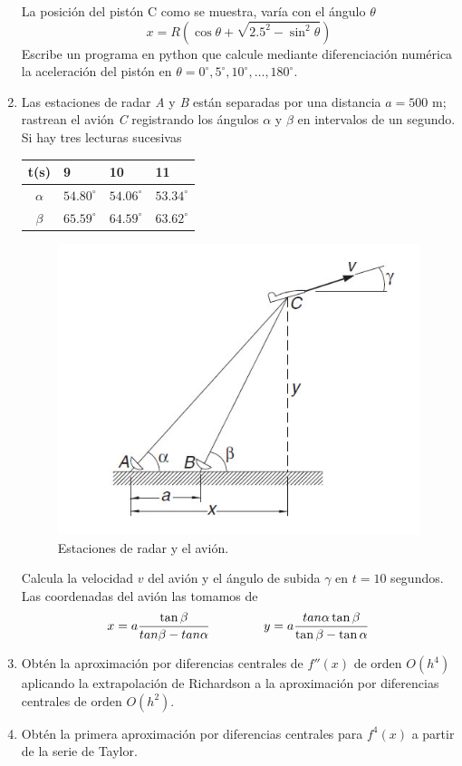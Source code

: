 \documentclass[11pt]{article}
\begin{document}
\begin{enumerate}
\begin{center}
\begin{tikzpicture}[font=\small, scale=1.4, fill=]
\end{tikzpicture}
\end{center}
La posición del pistón C como se muestra, varía con el ángulo $\theta$
\[x = R \left( \cos \theta + \sqrt{2.5^{2} - \sin^{2} \theta} \right)\]
Escribe un programa en python que calcule mediante diferenciación numérica la aceleración del pistón en $\theta= 0^{\circ}, 5^{\circ}, 10^{\circ},\ldots, 180^{\circ}$.
\item Las estaciones de radar \textit{A} y \textit{B} están separadas por una distancia $a=500$ m; rastrean el avión \textit{C} registrando los ángulos $\alpha$ y $\beta$ en intervalos de un segundo. Si hay tres lecturas sucesivas
\begin{center}
\begin{tabular}{c l l l }
t(s) & 9 & 10 & 11 \\ \hline
$\alpha$ & $54.80^{\circ}$ & $54.06^{\circ}$ & $53.34^{\circ}$ \\ \hline
$\beta$ & $65.59^{\circ}$ & $64.59^{\circ}$ & $63.62^{\circ}$
\end{tabular}
\end{center}
\begin{figure}[H]
	\centering
	\includegraphics[scale=0.6]{Imagenes/ExamenFinal02_01.jpg} 
	\caption{Estaciones de radar y el avión.}
\end{figure}
Calcula la velocidad $v$ del avión y el ángulo de subida $\gamma$ en $t=10$ segundos. Las coordenadas del avión las tomamos de
\[x = a \dfrac{\tan \beta}{tan \beta - tan \alpha} \hspace{1.5cm} y= a\dfrac{tan \alpha \tan \beta}{\tan \beta - \tan \alpha}\]
\item Obtén la aproximación por diferencias centrales de $f''(x)$ de orden $O(h^{4})$ aplicando la extrapolación de Richardson a la aproximación por diferencias centrales de orden $O(h^{2})$.
\item Obtén la primera aproximación por diferencias centrales para $f^{4}(x)$ a partir de la serie de Taylor.
\end{enumerate}
\end{document}
